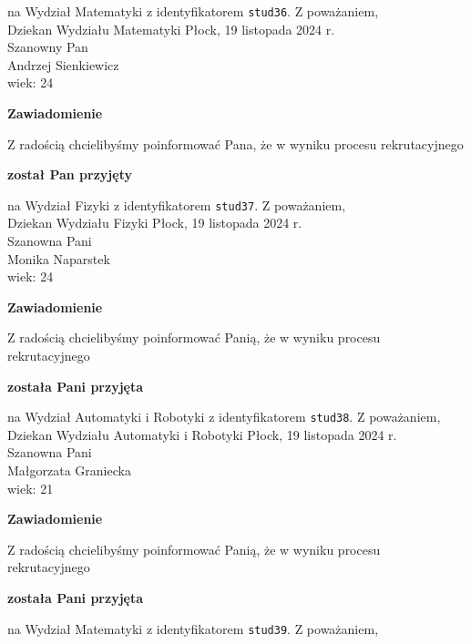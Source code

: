 \documentclass[12pt,a4paper]{article}
\begin{document}
na Wydział Matematyki z identyfikatorem \verb|stud36|. 
\vspace{2cm}
\noindent
Z poważaniem, \\
Dziekan
Wydziału Matematyki
\newpage
\hfill Płock, 19 listopada 2024 r. \\
\noindent
Szanowny Pan \\
Andrzej Sienkiewicz \\
wiek: 24
\bigskip
\begin{center}
    {\Large\textbf{Zawiadomienie}}
\end{center}
\bigskip 
Z radością chcielibyśmy poinformować Pana, że w wyniku procesu rekrutacyjnego
\begin{center}
\textsf{\textbf{został Pan przyjęty}}
\end{center}
na Wydział Fizyki z identyfikatorem \verb|stud37|. 
\vspace{2cm}
\noindent
Z poważaniem, \\
Dziekan
Wydziału Fizyki
\newpage
\hfill Płock, 19 listopada 2024 r. \\
\noindent
Szanowna Pani \\
Monika Naparstek \\
wiek: 24
\bigskip
\begin{center}
    {\Large\textbf{Zawiadomienie}}
\end{center}
\bigskip 
Z radością chcielibyśmy poinformować Panią, że w wyniku procesu rekrutacyjnego
\begin{center}
\textsf{\textbf{została Pani przyjęta}}
\end{center}
na Wydział Automatyki i Robotyki z identyfikatorem \verb|stud38|. 
\vspace{2cm}
\noindent
Z poważaniem, \\
Dziekan
Wydziału Automatyki i Robotyki
\newpage
\hfill Płock, 19 listopada 2024 r. \\
\noindent
Szanowna Pani \\
Małgorzata Graniecka \\
wiek: 21
\bigskip
\begin{center}
    {\Large\textbf{Zawiadomienie}}
\end{center}
\bigskip 
Z radością chcielibyśmy poinformować Panią, że w wyniku procesu rekrutacyjnego
\begin{center}
\textsf{\textbf{została Pani przyjęta}}
\end{center}
na Wydział Matematyki z identyfikatorem \verb|stud39|. 
\vspace{2cm}
\noindent
Z poważaniem, \\
\end{document}
